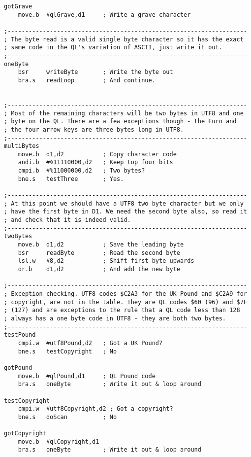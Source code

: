 \begin{lstlisting}[firstnumber=1, caption={Wolfgang's improved utf82ql Utility}]
gotGrave
    move.b  #qlGrave,d1     ; Write a grave character

;--------------------------------------------------------------------
; The byte read is a valid single byte character so it has the exact
; same code in the QL's variation of ASCII, just write it out.
;--------------------------------------------------------------------
oneByte
    bsr     writeByte       ; Write the byte out
    bra.s   readLoop        ; And continue.


;--------------------------------------------------------------------
; Most of the remaining characters will be two bytes in UTF8 and one
; byte on the QL. There are a few exceptions though - the Euro and 
; the four arrow keys are three bytes long in UTF8.
;--------------------------------------------------------------------
multiBytes
    move.b  d1,d2           ; Copy character code
    andi.b  #%11110000,d2   ; Keep top four bits
    cmpi.b  #%11000000,d2   ; Two bytes?
    bne.s   testThree       ; Yes.

;--------------------------------------------------------------------
; At this point we should have a UTF8 two byte character but we only
; have the first byte in D1. We need the second byte also, so read it
; and check that it is indeed valid.
;--------------------------------------------------------------------
twoBytes
    move.b  d1,d2           ; Save the leading byte
    bsr     readByte        ; Read the second byte
    lsl.w   #8,d2           ; Shift first byte upwards
    or.b    d1,d2           ; And add the new byte

;--------------------------------------------------------------------
; Exception checking. UTF8 codes $C2A3 for the UK Pound and $C2A9 for
; copyright, are not in the table. They are QL codes $60 (96) and $7F
; (127) and are exceptions to the rule that a QL code less than 128
; always has a one byte code in UTF8 - they are both two bytes.
;--------------------------------------------------------------------
testPound
    cmpi.w  #utf8Pound,d2   ; Got a UK Pound?
    bne.s   testCopyright   ; No

gotPound
    move.b  #qlPound,d1     ; QL Pound code
    bra.s   oneByte         ; Write it out & loop around

testCopyright
    cmpi.w  #utf8Copyright,d2 ; Got a copyright?
    bne.s   doScan          ; No

gotCopyright
    move.b  #qlCopyright,d1
    bra.s   oneByte         ; Write it out & loop around


\end{lstlisting}
